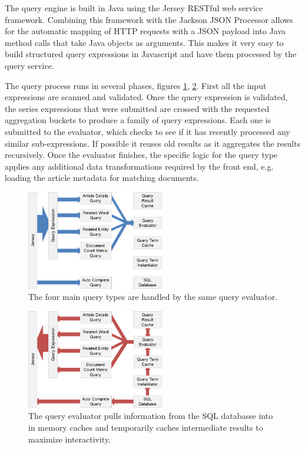 The query engine is built in Java using the Jersey RESTful web service framework.  Combining this framework with the Jackson JSON Processor allows for the automatic mapping of HTTP requests with a JSON payload into Java method calls that take Java objects as arguments.  This makes it very easy to build structured query expressions in Javascript and have them processed by the query service.

The query process runs in several phases, figures \ref{fig:query}, \ref{fig:pull}.  First all the input expressions are scanned and validated.  Once the query expression is validated, the series expressions that were submitted are crossed with the requested aggregation buckets to produce a family of query expressions.  Each one is submitted to the evaluator, which checks to see if it has recently processed any similar sub-expressions. If possible it reuses old results as it aggregates the results recursively.  Once the evaluator finishes, the specific logic for the query type applies any additional data transformations required by the front end, e.g. loading the article metadata for matching documents.

\begin{figure}[htb]
  \centerline{
    \includegraphics[width=60mm]{figures/query.png}
  }
  \caption{The four main query types are handled by the same query evaluator.}
  \label{fig:query}
\end{figure}

\begin{figure}[htb]
  \centerline{
    \includegraphics[width=60mm]{figures/pull.png}
  }
  \caption{The query evaluator pulls information from the SQL databasse into in memory caches and temporarily caches intermediate results to maximize interactivity.}
  \label{fig:pull}
\end{figure}


